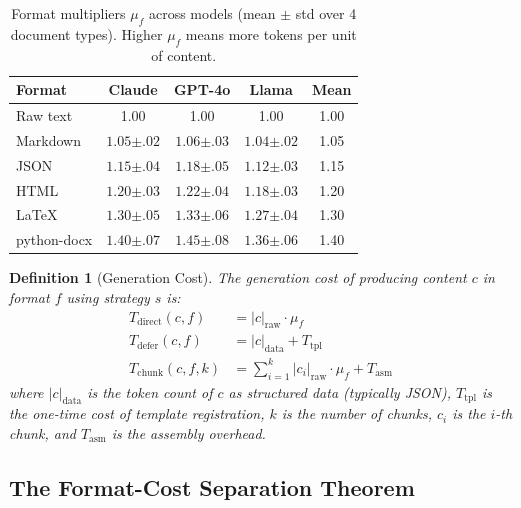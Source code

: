 \documentclass[11pt,twocolumn]{article}
\newtheorem{definition}{Definition}
\newcommand{\Tdir}{T_{\mathrm{direct}}}
\newcommand{\Tdef}{T_{\mathrm{defer}}}
\newcommand{\Tchnk}{T_{\mathrm{chunk}}}
\begin{document}
\begin{table}[t]
\centering
\caption{Format multipliers $\mu_f$ across models (mean $\pm$ std
over 4 document types).  Higher $\mu_f$ means more tokens per unit
of content.}
\label{tab:multipliers}
\small
\setlength{\tabcolsep}{3pt}
\begin{tabular}{@{}lcccc@{}}
\toprule
\textbf{Format} & \textbf{Claude} & \textbf{GPT-4o} & \textbf{Llama} & \textbf{Mean} \\
\midrule
Raw text    & 1.00 & 1.00 & 1.00 & 1.00 \\
Markdown    & $1.05{\scriptstyle\pm.02}$ & $1.06{\scriptstyle\pm.03}$ & $1.04{\scriptstyle\pm.02}$ & 1.05 \\
JSON        & $1.15{\scriptstyle\pm.04}$ & $1.18{\scriptstyle\pm.05}$ & $1.12{\scriptstyle\pm.03}$ & 1.15 \\
HTML        & $1.20{\scriptstyle\pm.03}$ & $1.22{\scriptstyle\pm.04}$ & $1.18{\scriptstyle\pm.03}$ & 1.20 \\
\LaTeX{}    & $1.30{\scriptstyle\pm.05}$ & $1.33{\scriptstyle\pm.06}$ & $1.27{\scriptstyle\pm.04}$ & 1.30 \\
python-docx & $1.40{\scriptstyle\pm.07}$ & $1.45{\scriptstyle\pm.08}$ & $1.36{\scriptstyle\pm.06}$ & 1.40 \\
\bottomrule
\end{tabular}
\end{table}

\begin{definition}[Generation Cost]
\label{def:cost}
The \emph{generation cost} of producing content $c$ in format $f$
using strategy $s$ is:
\begin{align}
\Tdir(c, f) &= |c|_{\text{raw}} \cdot \mu_f \label{eq:direct}\\
\Tdef(c, f) &= |c|_{\text{data}} + T_{\text{tpl}} \label{eq:defer}\\
\Tchnk(c, f, k) &= \sum_{i=1}^{k} |c_i|_{\text{raw}} \cdot \mu_f + T_{\text{asm}}
\label{eq:chunk}
\end{align}
where $|c|_{\text{data}}$ is the token count of $c$ as structured
data (typically JSON), $T_{\text{tpl}}$ is the one-time cost of
template registration, $k$ is the number of chunks, $c_i$ is the
$i$-th chunk, and $T_{\text{asm}}$ is the assembly overhead.
\end{definition}

\subsection{The Format-Cost Separation Theorem}
\end{document}
